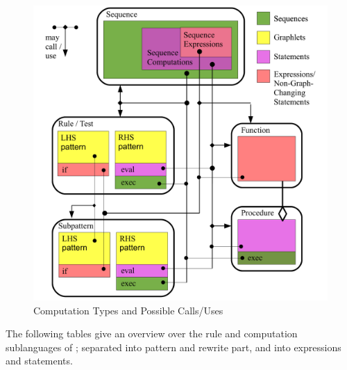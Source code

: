 \begin{figure}[hptb]
  \centering
  \includegraphics[width=1.0\textwidth]{fig/ComputationContainmentAndCallability}
  \caption{Computation Types and Possible Calls/Uses}
  \label{figcomptypescallsuses}
\end{figure}

The following tables give an overview over the rule and computation sublanguages of \GrG;
separated into pattern and rewrite part, and into expressions and statements.

